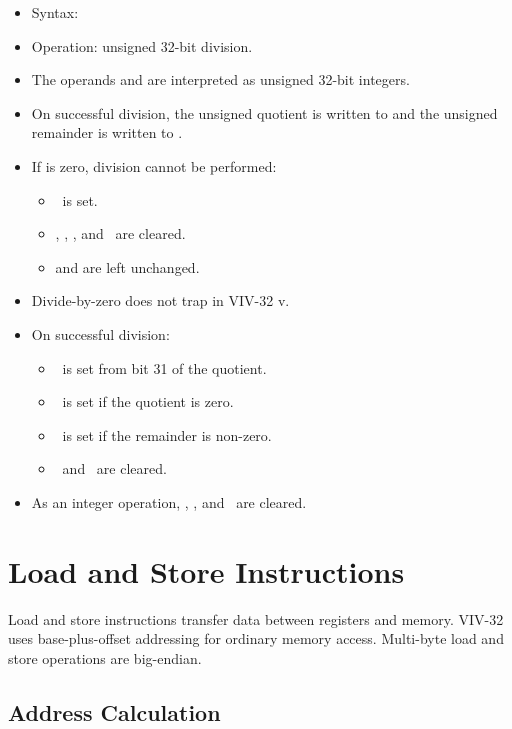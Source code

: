 \begin{itemize}
\item Syntax: 
\item Operation: unsigned 32-bit division.
\item The operands  and  are interpreted as unsigned
      32-bit integers.
\item On successful division, the unsigned quotient is written to
       and the unsigned remainder is written to .
\item If  is zero, division cannot be performed:
      \begin{itemize}
      \item \flagE\ is set.
      \item \flagN, \flagZ, \flagC, and \flagV\ are cleared.
      \item {} and  are left unchanged.
      \end{itemize}
\item Divide-by-zero does not trap in VIV-32 v\version{}.
\item On successful division:
      \begin{itemize}
      \item \flagN\ is set from bit 31 of the quotient.
      \item \flagZ\ is set if the quotient is zero.
      \item \flagC\ is set if the remainder is non-zero.
      \item \flagV\ and \flagE\ are cleared.
      \end{itemize}
\item As an integer operation, \flagI, \flagU, and \flagX\ are cleared.
\end{itemize}

\section{Load and Store Instructions}

Load and store instructions transfer data between registers and
memory. VIV-32 uses base-plus-offset addressing for ordinary memory access.
Multi-byte load and store operations are big-endian.

\subsection{Address Calculation}
\label{sec:load-store-address-calculation}

